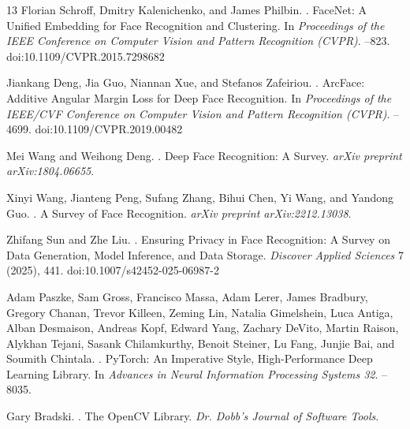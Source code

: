 \documentclass[10pt,twocolumn]{article}
\begin{document}
\begin{thebibliography}{13}
Florian Schroff, Dmitry Kalenichenko, and James Philbin.
.
\newblock FaceNet: A Unified Embedding for Face Recognition and Clustering.
\newblock In \textit{Proceedings of the IEEE Conference on Computer Vision and Pattern Recognition (CVPR)}.
--823.
\newblock doi:10.1109/CVPR.2015.7298682

Jiankang Deng, Jia Guo, Niannan Xue, and Stefanos Zafeiriou.
.
\newblock ArcFace: Additive Angular Margin Loss for Deep Face Recognition.
\newblock In \textit{Proceedings of the IEEE/CVF Conference on Computer Vision and Pattern Recognition (CVPR)}.
--4699.
\newblock doi:10.1109/CVPR.2019.00482

Mei Wang and Weihong Deng.
.
\newblock Deep Face Recognition: A Survey.
\newblock \textit{arXiv preprint arXiv:1804.06655}.

Xinyi Wang, Jianteng Peng, Sufang Zhang, Bihui Chen, Yi Wang, and Yandong Guo.
.
\newblock A Survey of Face Recognition.
\newblock \textit{arXiv preprint arXiv:2212.13038}.

Zhifang Sun and Zhe Liu.
.
\newblock Ensuring Privacy in Face Recognition: A Survey on Data Generation, Model Inference, and Data Storage.
\newblock \textit{Discover Applied Sciences} 7 (2025), 441.
\newblock doi:10.1007/s42452-025-06987-2

Adam Paszke, Sam Gross, Francisco Massa, Adam Lerer, James Bradbury, Gregory Chanan, Trevor Killeen, Zeming Lin, Natalia Gimelshein, Luca Antiga, Alban Desmaison, Andreas Kopf, Edward Yang, Zachary DeVito, Martin Raison, Alykhan Tejani, Sasank Chilamkurthy, Benoit Steiner, Lu Fang, Junjie Bai, and Soumith Chintala.
.
\newblock PyTorch: An Imperative Style, High-Performance Deep Learning Library.
\newblock In \textit{Advances in Neural Information Processing Systems 32}.
--8035.

Gary Bradski.
.
\newblock The OpenCV Library.
\newblock \textit{Dr. Dobb's Journal of Software Tools}.

\end{thebibliography}
\end{document}
